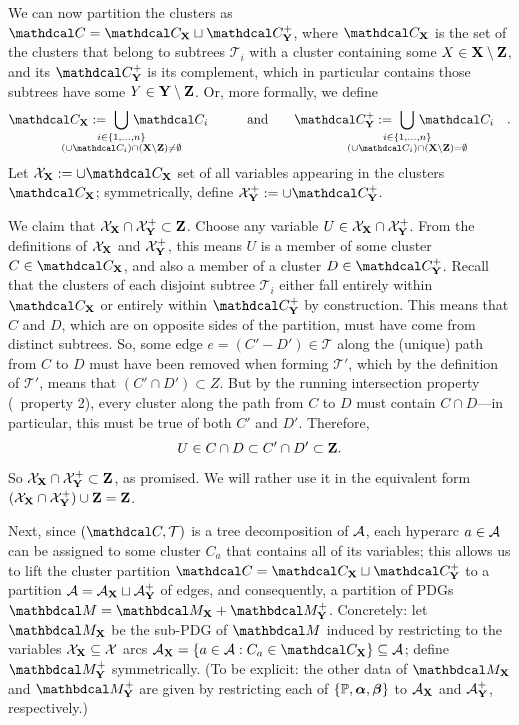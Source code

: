\begin{subappendices}
\begin{lproof}
    \def\CX{\C_{\mat X}}
    \def\CNX{\C_{\mat{Y}}^+}
    We can now partition the clusters as $\C = \CX \sqcup \CNX$, where
    $\CX$ is the set of the clusters that belong to subtrees $\mathcal T_i$ with a cluster containing some $X \in \mathbf X \setminus \mathbf Z$, and
    its $\CNX$ is its complement, which in particular contains those subtrees have some $Y \in \mathbf Y \setminus \mathbf Z$.
    Or, more formally, we define
    \[
        \CX :=~ \bigcup_{\mathclap{\substack{i \in \{1,\ldots,n\}\\ (\cup\C_i) \cap (\mat X\setminus\mat Z) \ne \emptyset }}}\, \C_i
        \quad\qquad \text{and}\qquad
        \CNX :=~ \bigcup_{\mathclap{\substack{i \in \{1,\ldots,n\}\\ (\cup\C_i) \cap (\mat X\setminus\mat Z) = \emptyset }}}\, \C_i
        \quad.
    \]
    \def\XX{\X_{\mat X}}
    \def\XNX{\X_{\mat Y}^+}
    Let $\XX := \cup \CX$ set of all variables appearing in the clusters $\CX$; symmetrically, define $\XNX := \cup \CNX$.


    We claim that $\XX \cap \XNX \subset \mat Z$.
    Choose any variable $U \in \XX \cap \XNX$.
    From the definitions of $\XX$ and $\XNX$, this means $U$ is a member of some cluster $C \in \CX$, and also a member of a cluster $D \in \CNX$.
    Recall that the clusters of each disjoint subtree $\mathcal T_i$ either fall entirely within $\CX$ or entirely within $\CNX$ by construction.
    This means that $C$ and $D$, which are on opposite sides of the partition, must have come from distinct subtrees.
    So, some edge $e = (C'{-}D') \in \mathcal T$ along the (unique) path from $C$ to $D$ must have been removed when forming $\mathcal T'$, which by the definition of $\mathcal T'$, means that $(C' \cap D') \subset Z$.
    But by the running intersection property (\actree\ property 2), every cluster along the path from $C$ to $D$ must contain $C \cap D$---in particular, this must be true of both $C'$ and $D'$.
    Therefore,
    \[
        U \in C \cap D \subset C' \cap D' \subset \mathbf Z.
    \]
    So $\XX \cap \XNX \subset \mat Z$, as promised.  We will rather use it in the equivalent form $(\XX \cap \XNX) \cup \mat Z = \mat Z$.

    Next, since $(\C, \cal T)$ is a tree decomposition of $\mathcal A$, each hyperarc $a \in \mathcal A$ can be assigned to some cluster $C_a$ that contains all of its variables; this allows us to lift the cluster partition $\C = \CX \sqcup \CNX$ to a partition $\mathcal A = \mathcal A_{\mathbf X} \sqcup \mathcal A_{\mathbf Y}^+$ of edges, and consequently, a partition of PDGs $\dg M = \dg M_{\mat X} \bundle \dg M_{\mat Y}^+$.
    Concretely: let $\dg M_{\mat X}$ be the sub-PDG of $\dg M$ induced by restricting to the variables $\XX \subseteq \X$ arcs $\Ar_{\mat X} = \{ a \in \Ar : C_a \in \CX \} \subseteq \Ar$; define $\dg M_{\mat Y}^+$ symmetrically. (To be explicit: the other data of $\dg M_{\mat X}$ and $\dg M_{\mat Y}^+$ are given by restricting each of $\{\mathbb P,\boldsymbol\alpha,\boldsymbol\beta\}$ to $\mathcal A_{\mathbf X}$ and $\mathcal A_{\mathbf Y}^+$, respectively.)


\end{lproof}
\end{subappendices}
